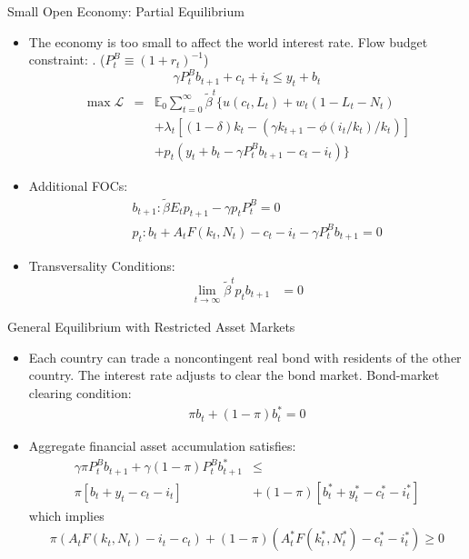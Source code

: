 \documentclass[10pt]{beamer}
\begin{document}
\begin{frame}{Small Open Economy: Partial Equilibrium}
\begin{itemize}
    \item The economy is too small to affect the world interest rate. Flow budget constraint: . ($P_t^B \equiv (1+r_t)^{-1}$)
\begin{equation}
    \gamma P_t^Bb_{t+1}+c_t+i_t \leq y_t+b_t
\end{equation}
\begin{eqnarray*}
\max \mathcal{L}&=&\mathbb{E}_0 \sum_{t=0}^{\infty}\tilde{\beta}^t \{u(c_t,L_t)+w_t(1-L_t-N_t)\\
&&+\lambda_t[(1-\delta)k_t-(\gamma k_{t+1}-\phi(i_t/k_t)/k_t)]\\
&&+p_t(y_t+b_t-\gamma P_t^Bb_{t+1}-c_t-i_t)\}
\end{eqnarray*}
\item Additional FOCs:
\begin{eqnarray}
&&b_{t+1}:\tilde{\beta}E_tp_{t+1}-\gamma p_tP_t^B=0 \\
&&p_t:b_t+A_tF(k_t,N_t)-c_t-i_t-\gamma P_t^Bb_{t+1}=0
\end{eqnarray}
\item  Transversality Conditions:
\begin{align}
\mathop {\lim }\limits_{t \to \infty }\tilde{\beta}^tp_tb_{t+1}&=0
\end{align}
\end{itemize}

\end{frame}

\begin{frame}{General Equilibrium with Restricted Asset Markets}
\begin{itemize}
    \item Each country can trade a noncontingent real bond with residents of the other country. The interest rate adjusts to clear the bond market. Bond-market clearing condition:
\begin{eqnarray}
\pi b_t+(1-\pi)b_t^*=0
\end{eqnarray}
    \item Aggregate financial asset accumulation satisfies:
\begin{align}
\gamma\pi P_t^Bb_{t+1}+\gamma(1-\pi)P_t^Bb_{t+1}^* &\leq\nonumber \\
\pi[b_t+y_t-c_t-i_t]&+(1-\pi)[b_t^*+y_t^*-c_t^*-i_t^*]
\end{align}
which implies
\begin{eqnarray}
\pi(A_tF(k_t,N_t)-i_t-c_t)+(1-\pi)(A_t^*F(k_t^*,N_t^*)-c_t^*-i_t^*)\geq 0
\end{eqnarray}
\end{itemize}



\end{frame}
\end{document}
